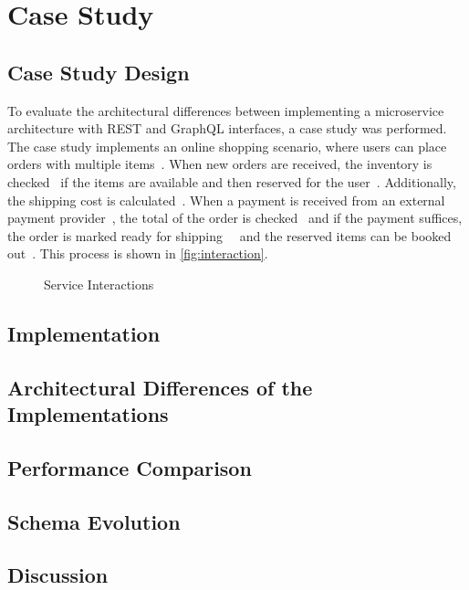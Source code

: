 \section{Case Study}\label{sec:case-study}

\subsection{Case Study Design}

To evaluate the architectural differences between implementing a microservice architecture with REST and GraphQL interfaces, a case study was performed.
The case study implements an online shopping scenario, where users can place orders with multiple items~\raisebox{.5pt}{\textcircled{\raisebox{-.9pt} {1}}}.
When new orders are received, the inventory is checked~\raisebox{.5pt}{\textcircled{\raisebox{-.9pt} {2}}} if the items are available and then reserved for the user~\raisebox{.5pt}{\textcircled{\raisebox{-.9pt} {3}}}.
Additionally, the shipping cost is calculated~\raisebox{.5pt}{\textcircled{\raisebox{-.9pt} {4}}}.
When a payment is received from an external payment provider~\raisebox{.5pt}{\textcircled{\raisebox{-.9pt} {5}}}, the total of the order is checked~\raisebox{.5pt}{\textcircled{\raisebox{-.9pt} {6}}} and if the payment suffices, the order is marked ready for shipping~\raisebox{.5pt}{\textcircled{\raisebox{-.9pt} {7}}}~\raisebox{.5pt}{\textcircled{\raisebox{-.9pt} {8}}} and the reserved items can be booked out~\raisebox{.5pt}{\textcircled{\raisebox{-.9pt} {9}}}.
This process is shown in \autoref{fig:interaction}.

\begin{figure}[!htb]
    \centering
    
    \caption{Service Interactions}
    \label{fig:interaction}
\end{figure}

\subsection{Implementation}

\subsection{Architectural Differences of the Implementations}

\subsection{Performance Comparison}

\subsection{Schema Evolution}

\subsection{Discussion}